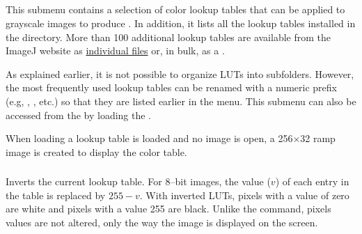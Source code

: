 

\subsection{\protect{}\label{sub:Lookup-Tables}}

This submenu contains a selection of color lookup tables that can
be applied to grayscale images to produce .
In addition, it lists all the lookup tables installed in the 
directory. More than 100 additional lookup tables are available from
the ImageJ website as \href{http://imagej.nih.gov/ij/download/luts/}{individual files}
or, in bulk, as a .

As explained earlier, it is not possible to organize LUTs into subfolders.
However, the most frequently used lookup tables can be renamed with
a numeric prefix (e.g, ,
,
etc.) so that they are listed earlier in the menu. This submenu can
also be accessed from the  by loading the . 

When loading a lookup table is loaded and no image is open, a 256$\times$32
ramp image is created to display the color table.




\subsubsection{\protect{}\label{sub:Invert-LUT}}

Inverts the current lookup table. For 8--bit images, the value ($v$)
of each entry in the table is replaced by $255-v$. With inverted
LUTs, pixels with a value of zero are white and pixels with a value
255 are black. Unlike the {\small {}}
command, pixels values are not altered, only the way the image is
displayed on the screen.


